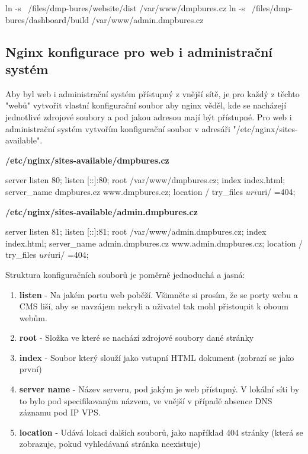 \documentclass[12pt,a4paper]{report}
\begin{document}
  \begin{bash}
    ln -s ~/files/dmp-bures/website/dist /var/www/dmpbures.cz
    ln -s ~/files/dmp-bures/dashboard/build /var/www/admin.dmpbures.cz
  \end{bash}

  \subsection{Nginx konfigurace pro web i administrační systém}
  Aby byl web i administrační systém přístupný z vnější sítě, je pro každý z těchto "webů"  vytvořit 
  vlastní konfigurační soubor aby nginx věděl, kde se nacházejí jednotlivé zdrojové soubory a 
  pod jakou adresou mají být přístupné.
  Pro web i administrační systém vytvořím konfigurační soubor v adresáři "/etc/nginx/sites-available".
  
  \noindent\textbf{/etc/nginx/sites-available/dmpbures.cz}
  \begin{bash}
  server {
    listen 80;
    listen [::]:80;
    root /var/www/dmpbures.cz;
    index index.html;
    server_name dmpbures.cz www.dmpbures.cz;
    location / {
      try_files $uri $uri/ =404;
    }
  }
  \end{bash}

  \noindent\textbf{/etc/nginx/sites-available/admin.dmpbures.cz}
  \begin{bash}
  server {
    listen 81;
    listen [::]:81;
    root /var/www/admin.dmpbures.cz;
    index index.html;
    server_name admin.dmpbures.cz www.admin.dmpbures.cz;
    location / {
      try_files $uri $uri/ =404;
    }
  }
  \end{bash}
  
  Struktura konfiguračních souborů je poměrně jednoduchá a jasná: 
  \begin{enumerate}
    \item \textbf{listen} - Na jakém portu web poběží. Všimněte si prosím, že se porty webu a CMS liší, aby se navzájem nekryli a uživatel tak mohl přistoupit k oboum webům.
    \item \textbf{root} - Složka ve které se nachází zdrojové soubory dané stránky
    \item \textbf{index} - Soubor který slouží jako vstupní HTML dokument (zobrazí se jako první)
    \item \textbf{server name} - Název serveru, pod jakým je web přístupný. V lokální síti by to bylo pod specifikovaným názvem, ve vnější v případě absence DNS záznamu pod IP VPS.
    \item \textbf{location} - Udává lokaci dalších souborů, jako například 404 stránky (která se zobrazuje, pokud vyhledávaná stránka neexistuje)
  \end{enumerate}
\end{document}
